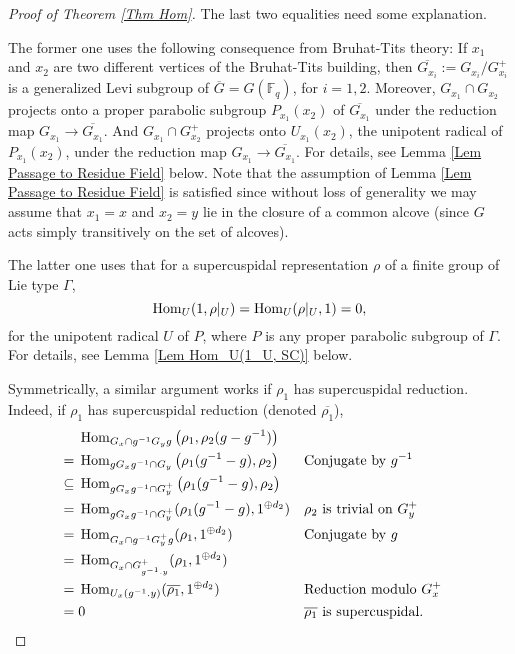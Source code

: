 \begin{proof}[Proof of Theorem \ref{Thm Hom}]
			The last two equalities need some explanation. 
			
			The former one uses the following consequence from Bruhat-Tits theory: If $x_1$ and $x_2$ are two different vertices of the Bruhat-Tits building, then $\overline{G_{x_i}}:=G_{x_i}/G_{x_i}^+$ is a generalized Levi subgroup of $\overline{G}=G(\mathbb{F}_q)$, for $i=1, 2$. Moreover, $G_{x_1} \cap G_{x_2}$ projects onto a proper parabolic subgroup $P_{x_1}(x_2)$ of $\overline{G_{x_1}}$ under the reduction map $G_{x_1} \to \overline{G_{x_1}}$. And $G_{x_1} \cap G_{x_2}^+$ projects onto $U_{x_1}(x_2)$, the unipotent radical of $P_{x_1}(x_2)$, under the reduction map $G_{x_1} \to \overline{G_{x_1}}$. For details, see Lemma \ref{Lem Passage to Residue Field} below. Note that the assumption of Lemma \ref{Lem Passage to Residue Field} is satisfied since without loss of generality we may assume that $x_1=x$ and $x_2=y$ lie in the closure of a common alcove (since $G$ acts simply transitively on the set of alcoves).
			
			The latter one uses that for a supercuspidal representation $\rho$ of a finite group of Lie type $\Gamma$, 
			$$\operatorname{\operatorname{Hom}}_U(1, \rho|_U)=\operatorname{\operatorname{Hom}}_U(\rho|_U, 1)=0,$$
			for the unipotent radical $U$ of $P$, where $P$ is any proper parabolic subgroup of $\Gamma$. For details, see Lemma \ref{Lem Hom_U(1_U, SC)} below.
			
			Symmetrically, a similar argument works if $\rho_1$ has supercuspidal reduction. Indeed, if $\rho_1$ has supercuspidal reduction (denoted $\overline{\rho_1}$),
			\begin{align*}    	
				& \Hom_{G_x \cap g^{-1}G_yg}\left(\rho_1, \rho_2(g-g^{-1})\right) \\
				=\;& \Hom_{gG_xg^{-1} \cap G_y}\left(\rho_1(g^{-1}-g), \rho_2\right) && \text{Conjugate by $g^{-1}$}\\ 
				\subseteq\;& \Hom_{gG_xg^{-1} \cap G_y^+}\left(\rho_1(g^{-1}-g), \rho_2\right) && %
				\\
				=\;& \Hom_{gG_xg^{-1} \cap G_y^+}(\rho_1(g^{-1}-g), 1^{\oplus d_2}) && \text{$\rho_2$ is trivial on $G_y^+$ }\\
				=\;& \Hom_{G_x \cap g^{-1}G_y^+g}(\rho_1, 1^{\oplus d_2}) && \text{Conjugate by $g$}\\
				=\;& \Hom_{G_x \cap G_{g^{-1}.y}^+}(\rho_1, 1^{\oplus d_2}) && \\
				=\;& \Hom_{U_x(g^{-1}.y)}(\overline{\rho_1}, 1^{\oplus d_2}) && \text{Reduction modulo $G_x^+$}\\
				=\;& 0 && \text{$\overline{\rho_1}$ is supercuspidal. }
			\end{align*}
			
		\end{proof}
		
